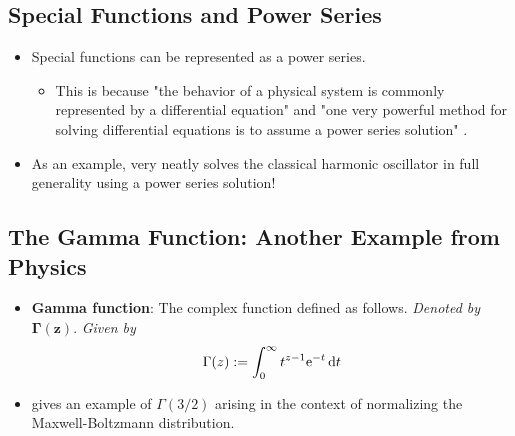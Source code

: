 \documentclass[../finalProject.tex]{subfiles}
\begin{document}
\subsection{Special Functions and Power Series}
\begin{itemize}
    \item Special functions can be represented as a power series.
    \begin{itemize}
        \item This is because "the behavior of a physical system is commonly represented by a differential equation" and "one very powerful method for solving differential equations is to assume a power series solution" \parencite[3]{bib:Seaborn}.
    \end{itemize}
    \item As an example, \textcite{bib:Seaborn} very neatly solves the classical harmonic oscillator in full generality using a power series solution!
\end{itemize}


\subsection{The Gamma Function: Another Example from Physics}
\begin{itemize}
    \item \textbf{Gamma function}: The complex function defined as follows. \emph{Denoted by} $\bm{\Gamma(z)}$. \emph{Given by}
    \begin{equation*}
        \Gamma(z) := \int_0^\infty t^{z-1}\e[-t]\dd{t}
    \end{equation*}
    \item \textcite{bib:Seaborn} gives an example of $\Gamma(3/2)$ arising in the context of normalizing the Maxwell-Boltzmann distribution.
\end{itemize}
\end{document}
